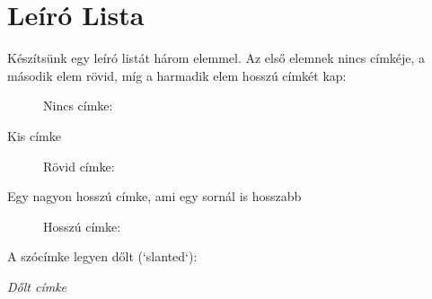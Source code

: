 \documentclass[12pt]{article}
\begin{document}
\section{Leíró Lista}
Készítsünk egy leíró listát három elemmel. Az első elemnek nincs címkéje, a második elem rövid, míg a harmadik elem hosszú címkét kap:

\begin{description}
  \item[] Nincs címke: \hulipsum[3]
  \item[Kis címke] Rövid címke: \hulipsum[4]
  \item[Egy nagyon hosszú címke, ami egy sornál is hosszabb] Hosszú címke: \hulipsum[5]
\end{description}

A szócímke legyen dőlt (`slanted`):

\begin{description}
  \item[\textsl{Dőlt címke}] \hulipsum[6]
\end{description}
\end{document}
